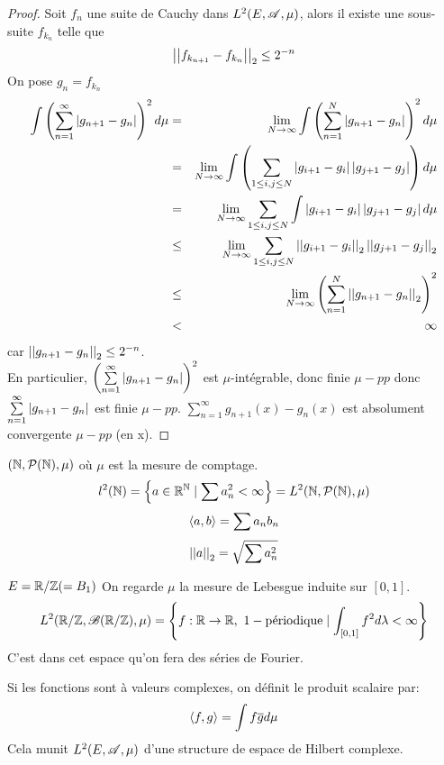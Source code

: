 \begin{proof}
	Soit $f_n$ une suite de Cauchy dans $L^2(E, \mathscr{A}, \mu)$, alors il existe une sous-suite $f_{k_n}$ telle que
	$$\left|\left|f_{k_{n+1}} - f_{k_n}\right|\right|_2 \leq 2^{-n}$$
	On pose $g_n = f_{k_n}$
	\begin{eqnarray*}
		\int \left( \sum\limits_{n=1}^\infty \left|g_{n+1} - g_n\right| \right)^2 d \mu &=& \lim_{N \to \infty} \int \left( \sum\limits_{n=1}^N \left|g_{n+1} - g_n\right| \right)^2 d \mu \\
		&=& \lim_{N \to \infty} \int \left( \sum\limits_{1 \leq i, j \leq N} \left|g_{i+1} - g_i\right| \left|g_{j+1} - g_j\right| \right) d \mu \\
		&=& \lim_{N \to \infty}   \sum\limits_{1 \leq i, j \leq N} \int\left|g_{i+1} - g_i\right| \left|g_{j+1} - g_j\right|  d \mu \\
		&\leq& \lim_{N \to \infty} \sum\limits_{1 \leq i, j \leq N} \left|\left|g_{i+1} - g_i\right|\right|_2 \left|\left|g_{j+1} - g_j\right|\right|_2 \\
		&\leq& \lim_{N \to \infty} \left( \sum\limits_{n=1}^N \left|\left|g_{n+1} - g_n\right|\right|_2 \right)^2 \\
		&<& \infty
	\end{eqnarray*}
	car $\left|\left|g_{n+1} - g_n\right|\right|_2 \leq 2^{-n}$.\\
	En particulier, $\left( \sum\limits_{n=1}^\infty \left|g_{n+1} - g_n\right| \right)^2$ est $\mu$-intégrable, donc finie $\mu-pp$ donc $ \sum\limits_{n=1}^\infty \left|g_{n+1} - g_n\right| $ est finie $\mu-pp$.
	$ \sum\limits_{n=1}^\infty g_{n+1}(x) - g_n(x)$ est absolument convergente $\mu-pp$ (en x).
\end{proof}

\begin{example}
	$(\mathbb{N}, \mathcal{P}(\mathbb{N}), \mu)$ où $\mu$ est la mesure de comptage.
	$$l^2(\mathbb{N}) = \left\{ a \in \mathbb{R}^{\mathbb{N}} \mid \sum a_n^2 < \infty\right\} = L^2(\mathbb{N}, \mathcal{P}(\mathbb{N}), \mu)$$
	$$\left\langle a, b \right\rangle = \sum a_n b_n$$
	$$\left|\left|a\right|\right|_2 = \sqrt{\sum a_n^2}$$
\end{example}

\begin{example}
	$ E = \mathbb{R}/\mathbb{Z} ( = B_1)$
	On regarde $\mu$ la mesure de Lebesgue induite sur $[0,1]$.
	$$ L^2(\mathbb{R}/\mathbb{Z}, \mathscr{B} (\mathbb{R}/\mathbb{Z}), \mu) = \left\{ f: \mathbb{R} \to \mathbb{R}, \  1-\text{périodique} \mid \int_{[0,1]} f^2 d\lambda < \infty \right\} $$
	C'est dans cet espace qu'on fera des séries de Fourier.
\end{example}

\begin{remarque}
	Si les fonctions sont à valeurs complexes, on définit le produit scalaire par:
	$$\left\langle f, g \right\rangle = \int f \overline{g} d \mu$$
	Cela munit $L^2(E, \mathscr{A}, \mu)$ d'une structure de espace de Hilbert complexe.
\end{remarque}
